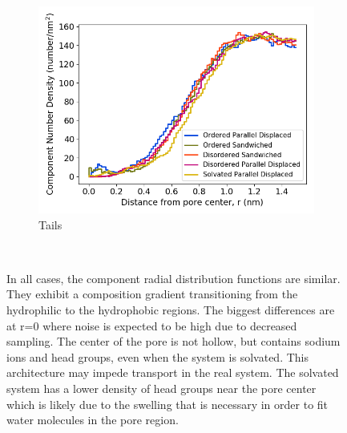 \documentclass[journal=jpcbfk,manuscript=article]{achemso}
\begin{document}
\begin{figure}[!htb]
\begin{subfigure}{0.32\textwidth}
        \includegraphics[width=1\linewidth]{tails_density.png}
        \caption{Tails}
        \label{fig:tails_regional_density}
  \end{subfigure}
  \caption{In all cases, the component radial distribution functions are similar. 
      They exhibit a composition gradient transitioning from the hydrophilic to the hydrophobic
	  regions. The biggest differences are at r=0 where noise is expected to be high due to 
	  decreased sampling. The center of the pore is not hollow, but contains sodium ions and 
	  head groups, even when the system is solvated. This architecture may impede transport in 
	  the real system. The solvated system has a lower density of head groups near the 
	  pore center which is likely due to the swelling that is necessary in order to fit water
	  molecules in the pore region.}~\label{fig:overlaid_densities}
  \end{figure}
\end{document}
